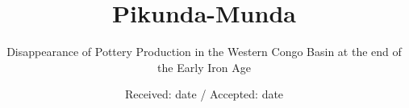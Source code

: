 \documentclass[smallextended,natbib]{svjour3}       %
\begin{document}
	
\title{Pikunda-Munda}
\subtitle{Disappearance of Pottery Production in the Western Congo Basin at the end of the Early Iron Age}

\author{}


\date{Received: date / Accepted: date}

\maketitle
\end{document}
